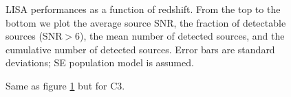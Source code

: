 \documentclass{iopart}
\begin{document}


\begin{figure}
\caption{LISA performances as a function of redshift. From the top to the bottom we plot the average source SNR, the fraction of detectable sources (SNR$>6$), the mean number of detected sources, and the cumulative number of detected sources. Error bars are standard deviations; SE population model is assumed.
\label{LISA_mc_SNR} } 
\end{figure}


\begin{figure}
\caption{Same as figure \ref{LISA_mc_SNR} but for C3.
\label{C3_mc_SNR} } 
\end{figure}
\end{document}
